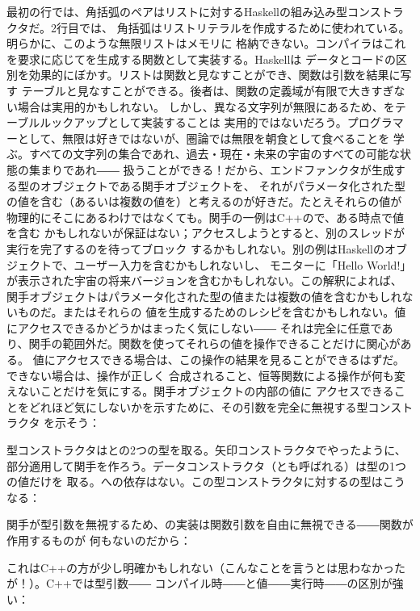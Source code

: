 最初の行では、角括弧のペアはリストに対するHaskellの組み込み型コンストラクタだ。2行目では、
角括弧はリストリテラルを作成するために使われている。明らかに、このような無限リストはメモリに
格納できない。コンパイラはこれを要求に応じてを生成する関数として実装する。Haskellは
データとコードの区別を効果的にぼかす。リストは関数と見なすことができ、関数は引数を結果に写す
テーブルと見なすことができる。後者は、関数の定義域が有限で大きすぎない場合は実用的かもしれない。
しかし、異なる文字列が無限にあるため、をテーブルルックアップとして実装することは
実用的ではないだろう。プログラマーとして、無限は好きではないが、圏論では無限を朝食として食べることを
学ぶ。すべての文字列の集合であれ、過去・現在・未来の宇宙のすべての可能な状態の集まりであれ――
扱うことができる！だから、エンドファンクタが生成する型のオブジェクトである関手オブジェクトを、
それがパラメータ化された型の値を含む（あるいは複数の値を）と考えるのが好きだ。たとえそれらの値が
物理的にそこにあるわけではなくても。関手の一例はC++ので、ある時点で値を含む
かもしれないが保証はない；アクセスしようとすると、別のスレッドが実行を完了するのを待ってブロック
するかもしれない。別の例はHaskellのオブジェクトで、ユーザー入力を含むかもしれないし、
モニターに「Hello World!」が表示された宇宙の将来バージョンを含むかもしれない。この解釈によれば、
関手オブジェクトはパラメータ化された型の値または複数の値を含むかもしれないものだ。またはそれらの
値を生成するためのレシピを含むかもしれない。値にアクセスできるかどうかはまったく気にしない――
それは完全に任意であり、関手の範囲外だ。関数を使ってそれらの値を操作できることだけに関心がある。
値にアクセスできる場合は、この操作の結果を見ることができるはずだ。できない場合は、操作が正しく
合成されること、恒等関数による操作が何も変えないことだけを気にする。関手オブジェクトの内部の値に
アクセスできることをどれほど気にしないかを示すために、その引数を完全に無視する型コンストラクタ
を示そう：

型コンストラクタはとの2つの型を取る。矢印コンストラクタでやったように、
部分適用して関手を作ろう。データコンストラクタ（とも呼ばれる）は型の1つの値だけを
取る。への依存はない。この型コンストラクタに対するの型はこうなる：

関手が型引数を無視するため、の実装は関数引数を自由に無視できる――関数が作用するものが
何もないのだから：

これはC++の方が少し明確かもしれない（こんなことを言うとは思わなかったが！）。C++では型引数――
コンパイル時――と値――実行時――の区別が強い：

